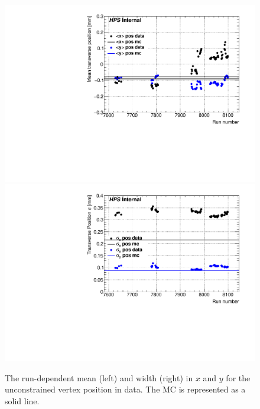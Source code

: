 \begin{figure}[t!]
    \centering
        \includegraphics[width=.85\textwidth]{figs/recon/xy_final.pdf}
        \includegraphics[width=.85\textwidth]{figs/recon/sigma_xy_final.pdf}
    \caption{%
    The run-dependent mean (left) and width (right) in $x$ and $y$ for the unconstrained vertex position in data. The MC is represented as a solid line.}
    \label{fig:rundepposxy}
\end{figure}


